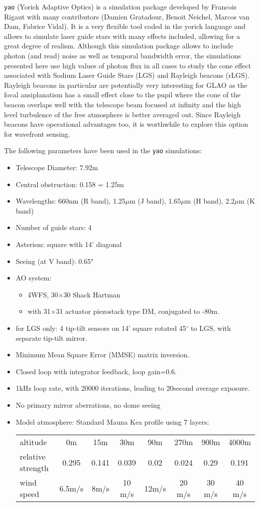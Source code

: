 \documentclass[aas_macros,10pt]{article}
\begin{document}
\texttt{yao} (Yorick Adaptive Optics) is a simulation package developed by Francois Rigaut with many contributors (Damien Gratadour, Benoit Neichel, Marcos van Dam, Fabrice Vidal). It is a very flexible tool coded in the yorick language and allows to simulate laser guide stars with many effects included, allowing for a great degree of realism. Although this simulation package allows to include photon (and read) noise as well as temporal bandwidth error, the simulations presented here use high values of photon flux in all cases to study the cone effect associated with Sodium Laser Guide Stars (LGS) and Rayleigh beacons (rLGS). Rayleigh beacons in particular are potentially very interesting for GLAO as the focal ansiplanatism has a small effect close to the pupil where the cone of the beacon overlaps well with the telescope beam focused at infinity and the high level turbulence of the free atmosphere is better averaged out. Since Rayleigh beacons have operational advantages too, it is worthwhile to explore this option for wavefront sensing.

The following parameters have been used in the \texttt{yao} simulations:
\begin{itemize}
\item Telescope Diameter: 7.92m
\item Central obstruction: 0.158 = 1.25m
\item Wavelengths: 660nm (R band), 1.25$\mu$m (J band), 1.65$\mu$m (H band), 2.2$\mu$m (K band)
\item Number of guide stars: 4
\item Asterism:  square with 14' diagonal
\item Seeing (at V band): 0.65"
\item AO system: 
\begin{itemize}
\item 4WFS, 30$\times$30 Shack Hartman 
\item with 31$\times$31 actuator piezostack type DM, conjugated to -80m.
\end{itemize}
\item for LGS only: 4 tip-tilt sensors on 14' square rotated 45$^{\circ}$ to LGS, with separate tip-tilt mirror.
\item Minimum Mean Square Error (MMSE) matrix inversion.
\item Closed loop with integrator feedback, loop gain=0.6.
\item 1kHz loop rate, with 20000 iterations, leading to 20second average exposure.
\item No primary mirror aberrations, no dome seeing
\item Model atmosphere: Standard Mauna Kea profile using 7 layers:

\begin{tabular}{lccccccc}
altitude & 0m & 15m & 30m & 90m & 270m & 900m & 4000m \\
relative strength & 0.295 & 0.141 & 0.039 & 0.02 & 0.024 & 0.29 & 0.191 \\
wind speed & 6.5m/s & 8m/s & 10 m/s & 12m/s & 20 m/s & 30 m/s & 40 m/s \\
\end{tabular}
\end{itemize}
\end{document}
